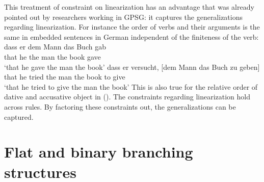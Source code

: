\documentclass[output=paper]{langsci/langscibook}
\begin{document}
This treatment of constraint on linearization has an advantage that was already pointed out by
researchers working in GPSG: it captures the generalizations regarding linearization. For instance
the order of verbs and their arguments is the same in embedded sentences in German independent of
the finiteness of the verb:
\eal
\ex 
\gll dass er dem Mann das Buch gab\\
     that he the man the book gave\\
\glt `that he gave the man the book'
\ex
\gll dass er versucht, [dem Mann das Buch zu geben]\\
     that he tried     \spacebr{}the man the book to give\\
\glt `that he tried to give the man the book'
\zl
This is also true for the relative order of dative and accusative object in (). The
constraints regarding linearization hold across rules. By factoring these constraints out, the
generalizations can be captured.


\section{Flat and binary branching structures}
\end{document}
